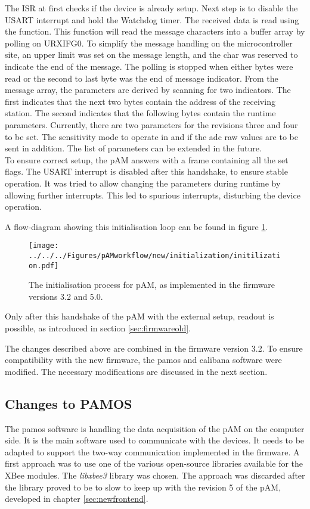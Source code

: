 The \ac{ISR} at first checks if the device is already setup. Next step is to disable the \ac{USART} interrupt and hold the Watchdog timer. The received data is read using the  function. 
This function will read the message characters into a buffer array by polling on URXIFG0. To simplify the message handling on the microcontroller site, an upper limit  was set on the message length, and the char  was reserved to indicate the end of the message. The polling is stopped when either  bytes were read or the second to last byte was the end of message indicator.
From the message array, the parameters are derived by scanning for two indicators. The first indicates that the next two bytes contain the address of the receiving station. The second indicates that the following bytes contain the runtime parameters. Currently, there are two parameters for the revisions three and four to be set. The sensitivity mode to operate in and if the \ac{adc} raw values are to be sent in addition.
The list of parameters can be extended in the future.\\


To ensure correct setup, the \ac{pAM} answers with a frame containing all the set flags. The USART interrupt is disabled after this handshake, to ensure stable operation.
It was tried to allow changing the parameters during runtime by allowing further interrupts. This led to spurious interrupts, disturbing the device operation. 

A flow-diagram showing this initialisation loop can be found in figure \ref{fig:firmware:new:init}.
\begin{figure}
	\centering	\texttt{[image: ../../../Figures/pAMworkflow/new/initialization/initilization.pdf]}
	\caption{The initialisation process for \ac{pAM}, as implemented in the firmware versions 3.2 and 5.0.}
	\label{fig:firmware:new:init}
\end{figure}

Only after this handshake of the \ac{pAM} with the external setup, readout is possible, as introduced in section \ref{sec:firmwareold}.

The changes described above are combined in the firmware version 3.2.
To ensure compatibility with the new firmware, the \ac{pamos} and \ac{calibana} software were modified. The necessary modifications are discussed in the next section.

\subsection{Changes to PAMOS}
The \ac{pamos} software is handling the data acquisition of the \ac{pAM} on the computer side. It is the main software used to communicate with the devices. It needs to be adapted to support the two-way communication implemented in the firmware. A first approach was to use one of the various open-source libraries available for the XBee modules. The \textit{libxbee3} library \cite{libxbee} was chosen. The approach was discarded after the library proved to be to slow to keep up with the revision 5 of the \ac{pAM}, developed in chapter \ref{sec:newfrontend}. 

